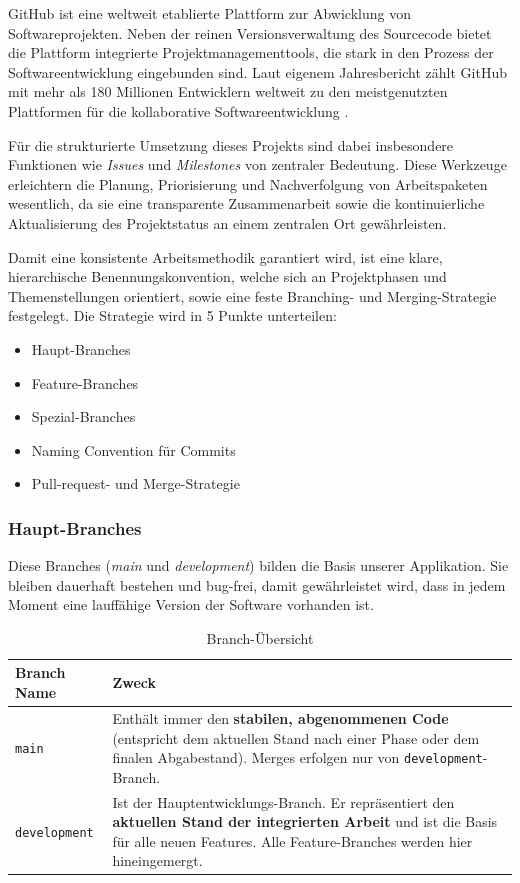 \label{ch:workflow}

GitHub ist eine weltweit etablierte Plattform zur Abwicklung von Softwareprojekten. Neben der reinen Versionsverwaltung des Sourcecode bietet die Plattform integrierte Projektmanagementtools, die stark in den Prozess der Softwareentwicklung eingebunden sind. Laut eigenem Jahresbericht \cite{github2025octoverse} zählt GitHub mit mehr als 180 Millionen Entwicklern weltweit zu den meistgenutzten Plattformen für die kollaborative Softwareentwicklung \cite{stackoverflow2025survey}. 

Für die strukturierte Umsetzung dieses Projekts sind dabei insbesondere Funktionen wie \textit{Issues} und \textit{Milestones} von zentraler Bedeutung. Diese Werkzeuge erleichtern die Planung, Priorisierung und Nachverfolgung von Arbeitspaketen wesentlich, da sie eine transparente Zusammenarbeit sowie die kontinuierliche Aktualisierung des Projektstatus an einem zentralen Ort gewährleisten.

Damit eine konsistente Arbeitsmethodik garantiert wird, ist eine klare, hierarchische Benennungskonvention, welche sich an Projektphasen und Themenstellungen orientiert, sowie eine feste Branching-\cite{git_branching_workflow_chacon2014progit} und Merging-Strategie festgelegt.
Die Strategie wird in 5 Punkte unterteilen:
\begin{itemize}
    \item Haupt-Branches
    \item Feature-Branches
    \item Spezial-Branches
    \item Naming Convention für Commits
    \item Pull-request- und Merge-Strategie
\end{itemize}
\subsubsection{Haupt-Branches}
Diese Branches (\textit{main} und \textit{development}) bilden die Basis unserer Applikation. Sie bleiben dauerhaft bestehen und bug-frei, damit gewährleistet wird, dass in jedem Moment eine lauffähige Version der Software vorhanden ist. 
\begin{table}[h]
\centering
\begin{tabular}{|p{}|p{}|}
\hline
\textbf{Branch Name} & \textbf{Zweck} \\
\hline
\texttt{main} &
Enthält immer den \textbf{stabilen, abgenommenen Code}
(entspricht dem aktuellen Stand nach einer Phase oder dem
finalen Abgabestand). Merges erfolgen nur von
\texttt{development}-Branch. \\
\hline
\texttt{development} &
Ist der Hauptentwicklungs-Branch. Er repräsentiert den
\textbf{aktuellen Stand der integrierten Arbeit} und ist
die Basis für alle neuen Features. Alle Feature-Branches
werden hier hineingemergt. \\
\hline
\end{tabular}
\caption{Branch-Übersicht}
\label{tab:branches}
\end{table}

